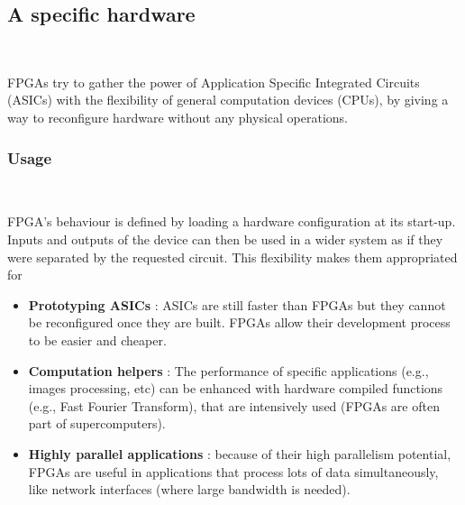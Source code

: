 \documentclass[10pt,a4paper]{article}
\renewcommand{\indent}{~\\\vspace{-.8cm}}
\begin{document}
\subsection{A specific hardware} \indent

FPGAs try to gather the power of Application Specific Integrated Circuits (ASICs) with the flexibility of general computation devices (CPUs), by giving a way to reconfigure hardware without any physical operations.

\subsubsection{Usage}
\indent

FPGA's behaviour is defined by loading a hardware configuration at its start-up. Inputs and outputs of the device can then be used in a wider system as if they were separated by the requested circuit. This flexibility makes them appropriated for

\begin{itemize}
	\item \textbf{Prototyping ASICs} : ASICs are still faster than FPGAs but they cannot be reconfigured once they are built. FPGAs allow their development process to be easier and cheaper.
	\item \textbf{Computation helpers} : The performance of specific applications (e.g., images processing, etc) can be enhanced with hardware compiled functions (e.g., Fast Fourier Transform), that are intensively used (FPGAs are often part of supercomputers).
	\item \textbf{Highly parallel applications} : because of their high parallelism potential, FPGAs are useful in applications that process lots of data simultaneously, like network interfaces (where large bandwidth is needed).
\end{itemize}
\end{document}
